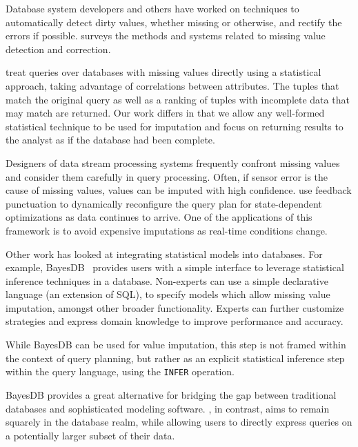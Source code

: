 Database system developers and others have worked on techniques to automatically
detect dirty values, whether missing or otherwise, and rectify the errors if
possible. \textcite*{hellerstein2008quantitative} surveys the methods and systems related to missing value detection and correction.

\textcite*{wolf2007query} treat queries over databases with missing values directly using a statistical approach, taking advantage of correlations between
attributes. The tuples that match the original query as well as a ranking of
tuples with incomplete data that may match are returned. Our work differs in
that we allow any well-formed statistical technique to be used for imputation
and focus on returning results to the analyst as if the database had been
complete.

Designers of data stream processing systems frequently confront missing values
and consider them carefully in query processing. Often, if sensor error is the
cause of missing values, values can be imputed with high confidence.  \textcite*{fernandez2009inter} use feedback punctuation to dynamically
reconfigure the query plan for state-dependent
optimizations as data continues to arrive. One of the applications of this framework is to avoid
expensive imputations as real-time conditions change. 

Other work has looked at integrating statistical models into databases.
For example, BayesDB~\cite{mansinghka2015bayesdb} provides users with a simple interface to leverage statistical inference techniques in a database. Non-experts
can use a simple declarative language (an extension of SQL), to specify models
which allow missing value imputation, amongst other broader functionality.
Experts can further customize strategies and express domain knowledge to
improve performance and accuracy.

While BayesDB can be used for value imputation, this step is not framed
within the context of query planning, but rather as an explicit statistical
inference step within the query language, using the \verb|INFER| operation. 

BayesDB provides a great alternative for bridging the gap between
traditional databases and sophisticated modeling software. \ProjectName{}, in
contrast, aims to remain squarely in the database realm, while allowing
users to directly express queries on a potentially larger subset of their data.

